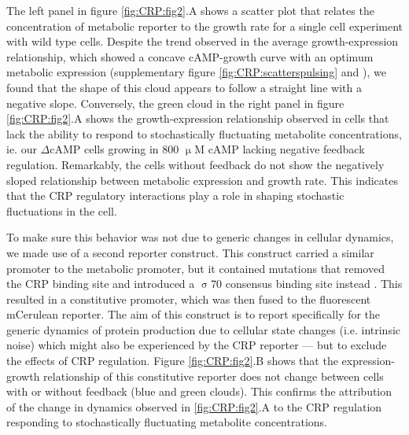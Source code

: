 %
The left panel in figure \ref{fig:CRP:fig2}.A shows a scatter plot that relates the concentration of metabolic reporter to the growth rate for a single cell experiment with wild type cells.
%
%
Despite the trend observed in the average growth-expression relationship, which showed a concave cAMP-growth curve with an optimum metabolic expression (supplementary figure \ref{fig:CRP:scatterspulsing} and \cite{Towbin2017}), 
we found that the shape of this cloud appears to follow a straight line with a negative slope.
%
Conversely, the green cloud in the right panel in figure \ref{fig:CRP:fig2}.A shows
the growth-expression relationship observed in cells 
that lack the ability to respond to stochastically fluctuating metabolite concentrations, ie. our $\Delta$cAMP cells growing in 800 $\upmu$M cAMP lacking negative feedback regulation.
%
Remarkably, the cells without feedback do not show the negatively sloped relationship between metabolic expression and growth rate.
%
This indicates that the CRP regulatory interactions play a role in shaping stochastic fluctuations in the cell. 

To make sure this behavior was not due to generic changes in cellular dynamics, we made use of a second reporter construct.
%
This construct carried a similar promoter to the metabolic promoter, but it contained mutations that removed the CRP binding site and introduced a $\upsigma$70 consensus binding site instead \cite{Towbin2017}.
%
This resulted in a constitutive promoter, which was then fused to the fluorescent mCerulean reporter.
%
The aim of this construct is to report specifically for the generic dynamics of protein production due to cellular state changes (i.e. intrinsic noise)
which might also be experienced by the CRP reporter ---
%
but to exclude the effects of CRP regulation.
%
Figure \ref{fig:CRP:fig2}.B shows that the expression-growth relationship of this constitutive reporter does not change between cells with or without feedback (blue and green clouds).
This confirms the attribution of the change in dynamics observed in \ref{fig:CRP:fig2}.A to the CRP regulation responding to stochastically fluctuating metabolite concentrations.

